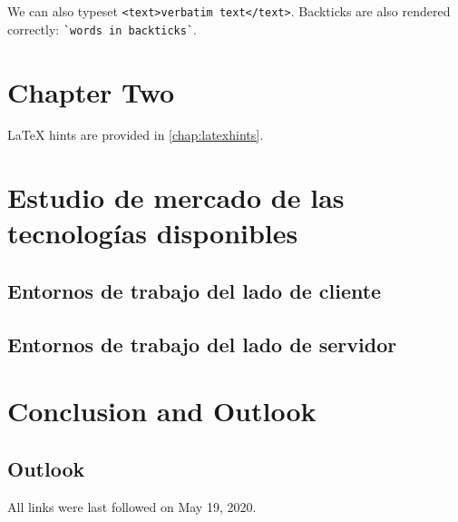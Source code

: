 \documentclass[
  a4paper,  %
  twoside,  %
  bibliography=totoc,
  headsepline,
  cleardoublepage=empty,
  parskip=half,
  draft=false
]{scrbook}
\begin{document}
We can also typeset \verb|<text>verbatim text</text>|.
Backticks are also rendered correctly: \verb|`words in backticks`|.

\chapter{Chapter Two}
\label{chap:k2}

LaTeX hints are provided in \cref{chap:latexhints}.

\chapter{Estudio de mercado de las tecnologías disponibles}
\label{chap:techMarketResearch}

\section{Entornos de trabajo del lado de cliente}



\section{Entornos de trabajo del lado de servidor}



\blinddocument

\chapter{Conclusion and Outlook}
\label{chap:zusfas}

\section*{Outlook}

\printbibliography

All links were last followed on May 19, 2020.

\appendix


\pagestyle{empty}
\renewcommand*{\chapterpagestyle}{empty}
\Versicherung
\end{document}
